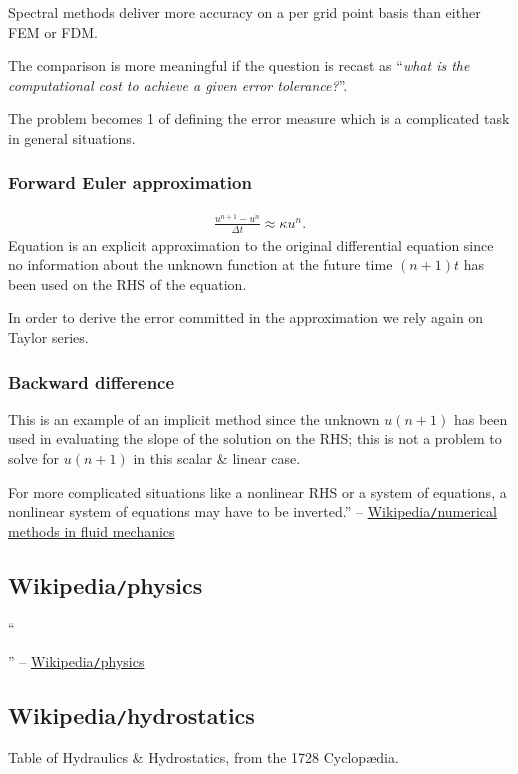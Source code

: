 \documentclass{article}
\begin{document}
Spectral methods deliver more accuracy on a per grid point basis than either FEM or FDM.

The comparison is more meaningful if the question is recast as ``\textit{what is the computational cost to achieve a given error tolerance?}''.

The problem becomes 1 of defining the error measure which is a complicated task in general situations.

\subsubsection{Forward Euler approximation}
\begin{align*}
	\frac{u^{n + 1} - u^n}{\Delta t}\approx\kappa u^n.
\end{align*}
Equation is an explicit approximation to the original differential equation since no information about the unknown function at the future time $(n + 1)t$ has been used on the RHS of the equation.

In order to derive the error committed in the approximation we rely again on Taylor series.

\subsubsection{Backward difference}
This is an example of an implicit method since the unknown $u(n + 1)$ has been used in evaluating the slope of the solution on the RHS; this is not a problem to solve for $u(n + 1)$ in this scalar \& linear case.

For more complicated situations like a nonlinear RHS or a system of equations, a nonlinear system of equations may have to be inverted.'' -- \href{https://en.wikipedia.org/wiki/Numerical_methods_in_fluid_mechanics}{Wikipedia{\tt/}numerical methods in fluid mechanics}


\subsection{Wikipedia{\tt/}physics}
``

'' -- \href{https://en.wikipedia.org/wiki/Physics}{Wikipedia{\tt/}physics}


\subsection{Wikipedia{\tt/}hydrostatics}
{\sf Table of Hydraulics \& Hydrostatics, from the 1728 Cyclop\ae dia.}
\end{document}
